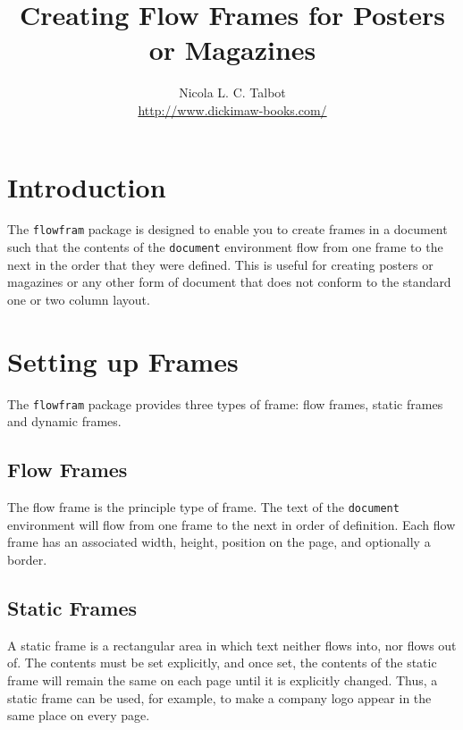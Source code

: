 \documentclass[a4paper,twoside]{report}
\newcommand{\sty}[1]{\texttt{#1}}
\newcommand{\env}[1]{\texttt{#1}}
\begin{document}
\title{Creating Flow Frames for Posters or Magazines}
\author{Nicola L. C. Talbot\\[1cm]\url{http://www.dickimaw-books.com/}}
\date{}
\maketitle

\tableofcontents

\chapter{Introduction}

The \sty{flowfram} package is designed to enable you to create
frames in a document such that the
contents of the \env{document} environment flow from one
frame to the next in the order that they were defined.
This is useful for creating posters
or magazines or any other form of document that does not
conform to the standard one or two column layout.

\chapter{Setting up Frames}

The \sty{flowfram} package provides three types of frame:
{flow frames}, {static
frames} and {dynamic frames}.

\section{Flow Frames}

The flow frame is the principle type of frame.
The text of the \env{document} environment will flow from
one frame to the next in order of definition. Each
flow frame has an associated width, height,
position on the page, and optionally a border.

\section{Static Frames}

A static frame is a rectangular area in which text neither
flows into, nor flows out of.  The contents must be set
explicitly, and once set, the contents of the static frame will
remain the same on each page until it is explicitly
changed.  Thus, a static frame can be used, for example, to make
a company logo appear in the same place on every page.
\end{document}
